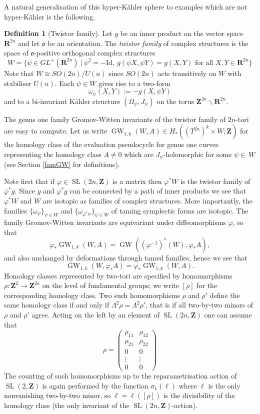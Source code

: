\documentclass[11pt]{amsart}
\newcommand{\RR}{\mathbf{R}}
\newcommand{\ZZ}{\mathbf{Z}}
\newcommand{\id}{\mathrm{Id}}
\newcommand{\GW}{\operatorname{GW}}
\newcommand{\WW}{W}
\newcommand{\orient}{\mathfrak{o}}
\renewcommand{\phi}{\varphi}
\newcommand{\OP}{\operatorname}
\numberwithin{equation}{section}
\theoremstyle{definition}
\newtheorem{dfn}[equation]{Definition}
\theoremstyle{remark}
\begin{document}
A natural generalisation of this hyper-K\"{a}hler sphere to examples which are not hyper-K\"{a}hler is the following.

\begin{dfn}[Twistor family]\label{torustwist}
Let $g$ be an inner product on the vector space $\RR^{2n}$ and let $\orient$ be an orientation. The \emph{twistor family} of complex structures is the space of $\orient$-positive orthogonal complex structures
\[\WW=\{\psi\in GL^+(\RR^{2n})\ |\ \psi^2=-\id,\ g(\psi X,\psi Y)=g(X,Y)\mbox{ for all }X,Y\in\RR^{2n}\}\]
Note that $\WW\cong SO(2n)/U(n)$ since $SO(2n)$ acts transitively on $\WW$ with stabiliser $U(n)$. Each $\psi\in\WW$ gives rise to a two-form
\[\omega_{\psi}(X,Y):=-g(X,\psi Y)\]
and to a bi-invariant K\"{a}hler structure $(\Omega_{\psi},J_{\psi})$ on the torus $\ZZ^{2n}\backslash\RR^{2n}$.
\end{dfn}

The genus one family Gromov-Witten invariants of the twistor family of $2n$-tori are easy to compute. Let us write $\GW_{1,k}(\WW,A)\in H_*((T^{2n})^k\times\WW;\ZZ)$ for the homology class of the evaluation pseudocycle for genus one curves representing the homology class $A\neq 0$ which are $J_{\psi}$-holomorphic for some $\psi\in~\!\WW$ (see Section \ref{famGW} for definitions).

Note first that if $\phi\in\OP{SL}(2n,\ZZ)$ is a matrix then $\phi^*\WW$ is the twistor family of $\phi^*g$. Since $g$ and $\phi^*g$ can be connected by a path of inner products we see that $\phi^*\WW$ and $\WW$ are isotopic as families of complex structures. More importantly, the families $\{\omega_{\psi}\}_{\psi\in\WW}$ and $\{\omega_{\phi^*\psi}\}_{\psi\in\WW}$ of taming symplectic forms are isotopic. The family Gromov-Witten invariants are equivariant under diffeomorphisms $\phi$, so that
\[\phi_*\GW_{1,k}(\WW,A)=\GW((\phi^{-1})^*(\WW),\phi_*A),\]
and also unchanged by deformations through tamed families, hence we see that
\[\GW_{1,k}(\WW,\phi_*A)=\phi_*\GW_{1,k}(\WW,A).\]
Homology classes represented by two-tori are specified by homomorphisms $\rho\colon\ZZ^2\to\ZZ^{2n}$ on the level of fundamental groups; we write $[\rho]$ for the corresponding homology class. Two such homomorphisms $\rho$ and $\rho'$ define the same homology class if and only if $\Lambda^2\rho=\Lambda^2\rho'$, that is if all two-by-two minors of $\rho$ and $\rho'$ agree. Acting on the left by an element of $\OP{SL}(2n,\ZZ)$ one can assume that
\[\rho=\left(\begin{array}{cc}
\rho_{11} & \rho_{12}\\
\rho_{21} & \rho_{22}\\
0 & 0\\
\vdots & \vdots\\
0 & 0
\end{array}\right)\]
The counting of such homomorphisms up to the reparametrisation action of $\OP{SL}(2,\ZZ)$ is again performed by the function $\sigma_1(\ell)$ where $\ell$ is the only nonvanishing two-by-two minor, so $\ell=\ell([\rho])$ is the divisibility of the homology class (the only invariant of the $\OP{SL}(2n,\ZZ)$-action).
\end{document}
